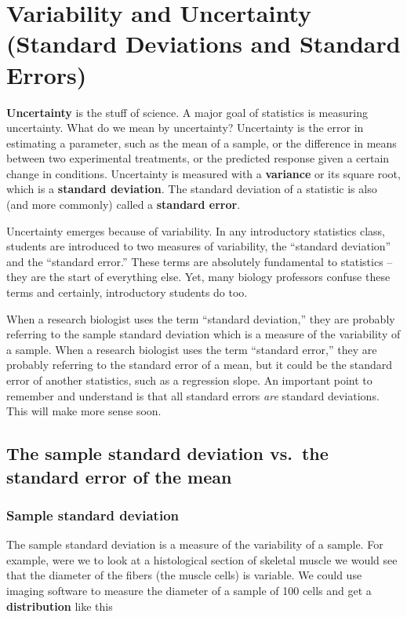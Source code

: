\documentclass[]{book}
\theoremstyle{definition}
\theoremstyle{definition}
\theoremstyle{definition}
\theoremstyle{remark}
\begin{document}
\chapter{Variability and Uncertainty (Standard Deviations and Standard
Errors)}\label{variability-and-uncertainty-standard-deviations-and-standard-errors}

\textbf{Uncertainty} is the stuff of science. A major goal of statistics
is measuring uncertainty. What do we mean by uncertainty? Uncertainty is
the error in estimating a parameter, such as the mean of a sample, or
the difference in means between two experimental treatments, or the
predicted response given a certain change in conditions. Uncertainty is
measured with a \textbf{variance} or its square root, which is a
\textbf{standard deviation}. The standard deviation of a statistic is
also (and more commonly) called a \textbf{standard error}.

Uncertainty emerges because of variability. In any introductory
statistics class, students are introduced to two measures of
variability, the ``standard deviation'' and the ``standard error.''
These terms are absolutely fundamental to statistics -- they are the
start of everything else. Yet, many biology professors confuse these
terms and certainly, introductory students do too.

When a research biologist uses the term ``standard deviation,'' they are
probably referring to the sample standard deviation which is a measure
of the variability of a sample. When a research biologist uses the term
``standard error,'' they are probably referring to the standard error of
a mean, but it could be the standard error of another statistics, such
as a regression slope. An important point to remember and understand is
that all standard errors \emph{are} standard deviations. This will make
more sense soon.

\section{The sample standard deviation vs.~the standard error of the
mean}\label{the-sample-standard-deviation-vs.the-standard-error-of-the-mean}

\subsection{Sample standard deviation}\label{sample-standard-deviation}

The sample standard deviation is a measure of the variability of a
sample. For example, were we to look at a histological section of
skeletal muscle we would see that the diameter of the fibers (the muscle
cells) is variable. We could use imaging software to measure the
diameter of a sample of 100 cells and get a \textbf{distribution} like
this
\end{document}
